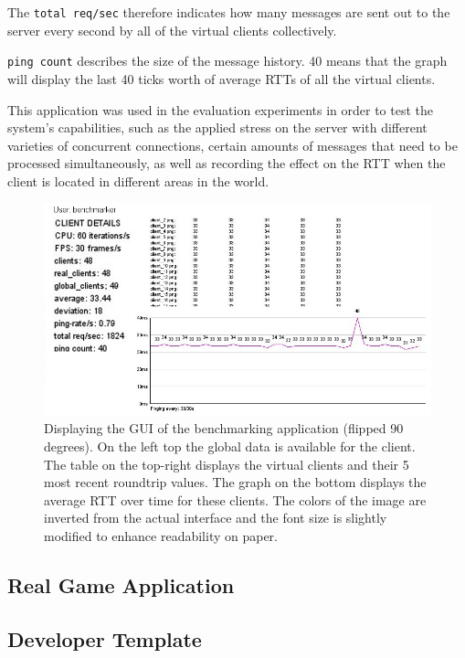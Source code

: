 \documentclass[bsc,frontabs,twoside,singlespacing,parskip,deptreport]{infthesis}     %
\begin{document}
The \texttt{total req/sec} therefore indicates how many messages are sent out to the server every second by all of the virtual clients collectively.

\texttt{ping count} describes the size of the message history. 40 means that the graph will display the last 40 ticks worth of average RTTs of all the virtual clients.

This application was used in the evaluation experiments in order to test the system's capabilities, such as the applied stress on the server with different varieties of concurrent connections, certain amounts of messages that need to be processed simultaneously, as well as recording the effect on the RTT when the client is located in different areas in the world.

\begin{figure}
\centering
\includegraphics[scale=0.75, angle=90]{images/benchmarker.jpg}
\caption{Displaying the GUI of the benchmarking application (flipped 90 degrees). On the left top the global data is available for the client. The table on the top-right displays the virtual clients and their 5 most recent roundtrip values. The graph on the bottom displays the average RTT over time for these clients. The colors of the image are inverted from the actual interface and the font size is slightly modified to enhance readability on paper.}
\label{fig:benchmark_gui}
\vspace{1em}
\end{figure}

\subsection{Real Game Application}
\subsection{Developer Template}
\end{document}
